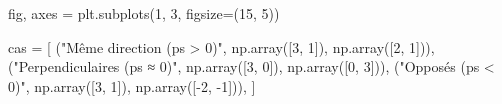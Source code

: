 \documentclass[
  french,
  11pt,
  a4paper,
]{scrbook}
\newenvironment{Shaded}{}{}
\newcommand{\DecValTok}[1]{\textcolor[rgb]{0.00,0.36,0.77}{#1}}
\newcommand{\NormalTok}[1]{\textcolor[rgb]{0.14,0.16,0.18}{#1}}
\newcommand{\OperatorTok}[1]{\textcolor[rgb]{0.14,0.16,0.18}{#1}}
\newcommand{\StringTok}[1]{\textcolor[rgb]{0.01,0.18,0.38}{#1}}
\begin{document}
\begin{Shaded}
\begin{Highlighting}[]
\NormalTok{fig, axes }\OperatorTok{=}\NormalTok{ plt.subplots(}\DecValTok{1}\NormalTok{, }\DecValTok{3}\NormalTok{, figsize}\OperatorTok{=}\NormalTok{(}\DecValTok{15}\NormalTok{, }\DecValTok{5}\NormalTok{))}

\NormalTok{cas }\OperatorTok{=}\NormalTok{ [}
\NormalTok{    (}\StringTok{"Même direction (ps \textgreater{} 0)"}\NormalTok{, np.array([}\DecValTok{3}\NormalTok{, }\DecValTok{1}\NormalTok{]), np.array([}\DecValTok{2}\NormalTok{, }\DecValTok{1}\NormalTok{])),}
\NormalTok{    (}\StringTok{"Perpendiculaires (ps ≈ 0)"}\NormalTok{, np.array([}\DecValTok{3}\NormalTok{, }\DecValTok{0}\NormalTok{]), np.array([}\DecValTok{0}\NormalTok{, }\DecValTok{3}\NormalTok{])),}
\NormalTok{    (}\StringTok{"Opposés (ps \textless{} 0)"}\NormalTok{, np.array([}\DecValTok{3}\NormalTok{, }\DecValTok{1}\NormalTok{]), np.array([}\OperatorTok{{-}}\DecValTok{2}\NormalTok{, }\OperatorTok{{-}}\DecValTok{1}\NormalTok{])),}
\NormalTok{]}


\end{Highlighting}
\end{Shaded}
\end{document}
